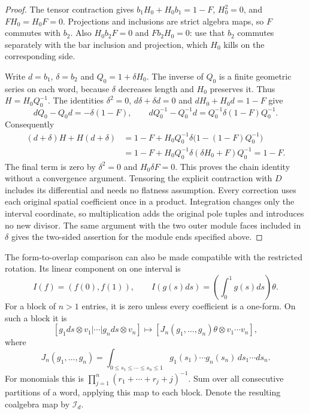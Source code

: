 \begin{proof}
The tensor contraction gives
\(b_1H_0+H_0b_1=1-F\), \(H_0^2=0\), and
\(FH_0=H_0F=0\).  Projections and inclusions are strict
algebra maps, so \(F\) commutes with \(b_2\).
Also \(H_0b_2F=0\) and \(Fb_2H_0=0\): use that
\(b_2\) commutes separately with the bar inclusion and
projection, which \(H_0\) kills on the corresponding side.

Write \(d=b_1\), \(\delta=b_2\) and \(Q_0=1+\delta H_0\).
The inverse of \(Q_0\) is a finite geometric series on each
word, because \(\delta\) decreases length and \(H_0\)
preserves it.  Thus \(H=H_0Q_0^{-1}\).
The identities \(\delta^2=0\),
\(d\delta+\delta d=0\) and
\(dH_0+H_0d=1-F\) give
\[
 dQ_0-Q_0d=-\delta(1-F),\qquad
 dQ_0^{-1}-Q_0^{-1}d=Q_0^{-1}\delta(1-F)Q_0^{-1}.
\]
Consequently
\[
 \begin{aligned}
 (d+\delta)H+H(d+\delta)
 &=1-F+H_0Q_0^{-1}\delta
              \bigl(1-(1-F)Q_0^{-1}\bigr)\\
 &=1-F+H_0Q_0^{-1}\delta(\delta H_0+F)Q_0^{-1}
 =1-F.
 \end{aligned}
\]
The final term is zero by \(\delta^2=0\) and
\(H_0\delta F=0\).  This proves the chain identity without
a convergence argument.  Tensoring the explicit contraction with
\(D\) includes its differential and needs no flatness assumption.
Every correction uses each original spatial coefficient once in a
product.  Integration changes only the interval coordinate, so
multiplication adds the original pole tuples and introduces no
new divisor.  The same argument with the two outer module faces
included in \(\delta\) gives the two-sided assertion for the
module ends specified above.
\end{proof}

The form-to-overlap comparison can also be made compatible with the
restricted rotation.  Its linear component on one interval is
\[
 I(f)=(f(0),f(1)),\qquad
 I(g(s)ds)=\left(\int_0^1g(s)ds\right)\theta.
\]
For a block of \(n>1\) entries, it is zero unless every
coefficient is a one-form.  On such a block it is
\[
 [g_1ds\otimes v_1|\cdots|g_nds\otimes v_n]
 \longmapsto
 [J_n(g_1,\ldots,g_n)\theta\otimes v_1\cdots v_n],
\]
where
\[
 J_n(g_1,\ldots,g_n)=
 \int_{0\le s_1\le\cdots\le s_n\le1}
                 g_1(s_1)\cdots g_n(s_n)\,ds_1\cdots ds_n.
\]
For monomials this is
\(\prod_{j=1}^n(r_1+\cdots+r_j+j)^{-1}\).
Sum over all consecutive partitions of a word, applying this map
to each block.  Denote the resulting coalgebra map by \(\mathcal I_d\).

